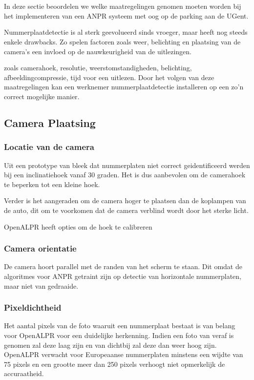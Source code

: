 
\chapter{}
\label{ch:maatregelingenanpr}

In deze sectie beoordelen we welke maatregelingen genomen moeten worden bij het implementeren van een ANPR systeem met oog op de parking aan de UGent.

Nummerplaatdetectie is al sterk geevolueerd sinds vroeger, maar heeft nog steeds enkele drawbacks. Zo spelen factoren zoals weer, belichting en plaatsing van de camera's een invloed op de nauwkeurigheid van de uitlezingen.

zoals camerahoek, resolutie, weerstomstandigheden, belichting, afbeeldingcompressie, tijd voor een uitlezen. Door het volgen van deze maatregelingen kan een werknemer nummerplaatdetectie installeren op een zo'n correct mogelijke manier.

\section{Camera Plaatsing}

\subsection{Locatie van de camera}
Uit een prototype van \textcite{arrieta2019prototype} bleek dat nummerplaten niet correct geidentificeerd werden bij een inclinatiehoek vanaf 30 graden. Het is dus aanbevolen om de camerahoek te beperken tot een kleine hoek.

Verder is het aangeraden om de camera hoger te plaatsen dan de koplampen van de auto, dit om te voorkomen dat de camera verblind wordt door het sterke licht.

OpenALPR heeft opties om de hoek te calibreren \autocite{openalprdocumentation}

\subsection{Camera orientatie}
De camera hoort parallel met de randen van het scherm te staan. Dit omdat de algoritmes voor ANPR getraint zijn op detectie van horizontale nummerplaten, maar niet van gedraaide.

\subsection{Pixeldichtheid}
Het aantal pixels van de foto waaruit een nummerplaat bestaat is van belang voor OpenALPR voor een duidelijke herkenning. Indien een foto van veraf is genomen zal deze laag zijn en van dichtbij zal deze dan weer hoog zijn. OpenALPR verwacht voor Europeaanse nummerplaten minstens een wijdte van 75 pixels en een grootte meer dan 250 pixels verhoogt niet opmerkelijk de accuraatheid. \autocite{openalprcameraplacement}

